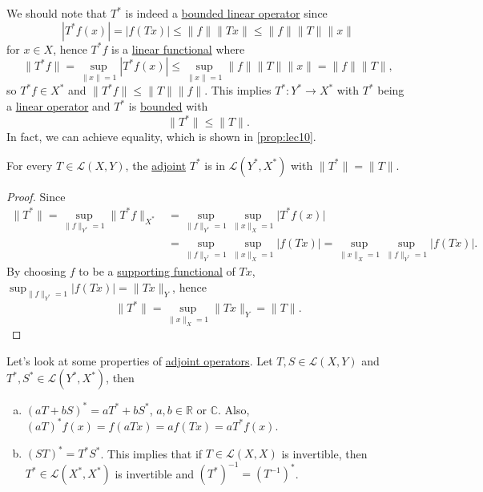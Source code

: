 We should note that \(T^{\ast} \) is indeed a \hyperref[def:bounded-linear-op]{bounded linear operator} since
\[
	\left\vert T^{\ast} f(x) \right\vert = \left\vert f(Tx) \right\vert \leq \lVert f\rVert \lVert Tx\rVert \leq \lVert f\rVert \lVert T\rVert \lVert x\rVert
\]
for \(x\in X\), hence \(T^{\ast} f\) is a \hyperref[def:linear-functional]{linear functional} where
\[
	\lVert T^{\ast} f\rVert = \sup_{\lVert x\rVert = 1} \left\vert T^{\ast} f(x) \right\vert \leq \sup _{\lVert x\rVert = 1}\lVert f\rVert \lVert T\rVert \lVert x\rVert = \lVert f\rVert \lVert T\rVert,
\]
so \(T^{\ast} f\in X^{\ast} \) and \(\lVert T^{\ast} f\rVert \leq \lVert T\rVert \lVert f\rVert \). This implies \(T^{\ast} \colon Y^{\ast} \to X^{\ast} \) with \(T^{\ast} \) being a \hyperref[def:linear-op]{linear operator} and \(T^{\ast} \) is \hyperref[def:bounded-linear-op]{bounded} with
\[
	\lVert T^{\ast} \rVert \leq \lVert T\rVert .
\]
In fact, we can achieve equality, which is shown in \autoref{prop:lec10}.

\begin{proposition}\label{prop:lec10}
	For every \(T\in \mathcal{L} (X,Y)\), the \hyperref[def:adjoint-op]{adjoint} \(T^{\ast} \) is in \(\mathcal{L} (Y^{\ast} , X^{\ast} )\) with \(\lVert T^{\ast} \rVert = \lVert T\rVert \).
\end{proposition}
\begin{proof}
	Since
	\[
		\begin{split}
			\lVert T^{\ast}  \rVert
			= \sup _{\lVert f \rVert _{Y^{\ast} }= 1}\lVert T^{\ast} f \rVert _{X^{\ast} }
			&= \sup _{\lVert f \rVert _{Y^{\ast} } = 1} \sup _{\lVert x \rVert _X = 1}\vert T^{\ast} f(x)  \vert\\
			&= \sup_{\lVert f \rVert _{Y^{\ast} }= 1}\sup _{\lVert x \rVert _X = 1} \vert f(Tx)  \vert
			= \sup _{\lVert x \rVert _X = 1} \sup _{\lVert f \rVert _{Y^{\ast} } = 1} \vert f(Tx)  \vert.
		\end{split}
	\]
	By choosing \(f\) to be a \hyperref[thm:supporting-functional]{supporting functional} of \(Tx\), \(\sup _{\lVert f \rVert _{Y^{\ast} }=1}\vert f(Tx)  \vert = \lVert Tx \rVert _{Y}\), hence
	\[
		\lVert T^{\ast} \rVert
		= \sup _{\lVert x \rVert _X = 1} \lVert Tx \rVert _{Y}
		= \lVert T \rVert.
	\]
\end{proof}

Let's look at some properties of \hyperref[def:adjoint-op]{adjoint operators}. Let \(T, S\in \mathcal{L} (X, Y)\) and \(T^{\ast} , S^{\ast} \in \mathcal{L} (Y^{\ast} , X^{\ast} )\), then
\begin{enumerate}[(a)]
	\item \((aT + bS)^{\ast} = aT^{\ast} + bS^{\ast} \), \(a, b\in \mathbb{R} \) or \(\mathbb{C} \). Also, \((aT)^{\ast} f(x) = f(aTx) = af(Tx) = aT^{\ast} f(x)\).
	\item \((ST)^{\ast} = T^{\ast} S^{\ast} \). This implies that if \(T\in \mathcal{L} (X, X)\) is invertible, then \(T^{\ast} \in \mathcal{L} (X^{\ast} , X^{\ast} )\) is invertible and \((T^{\ast} )^{-1} = (T^{-1} )^{\ast} \).
\end{enumerate}

